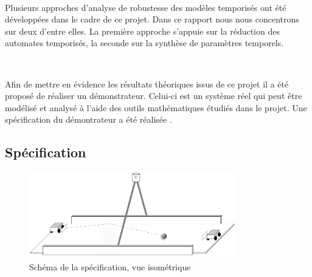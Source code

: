       ~
    
      Plusieurs approches d'analyse de robustesse des modèles temporisés ont été
      développées dans le cadre de ce projet. Dans ce rapport nous nous
      concentrons sur deux d'entre elles. La première approche s'appuie sur la
      réduction des automates temporisés, la seconde sur la synthèse de
      paramètres temporels.

      ~

      Afin de
      mettre en évidence les résultats théoriques issus de ce projet il a été
      proposé de réaliser un démonstrateur. Celui-ci est un système réel qui peut
      être modélisé et analysé à l'aide des outils mathématiques étudiés dans le
      projet. Une spécification du démontrateur a été réalisée \cite{bechennec12}.

    \subsection{Spécification}

      \begin{figure}
        \centering
        \includegraphics[width=0.8\textwidth]{./img/spec-demo1.pdf}
        \caption{Schéma de la spécification, vue isométrique}
        \label{fig:spec-demo1}
      \end{figure}

